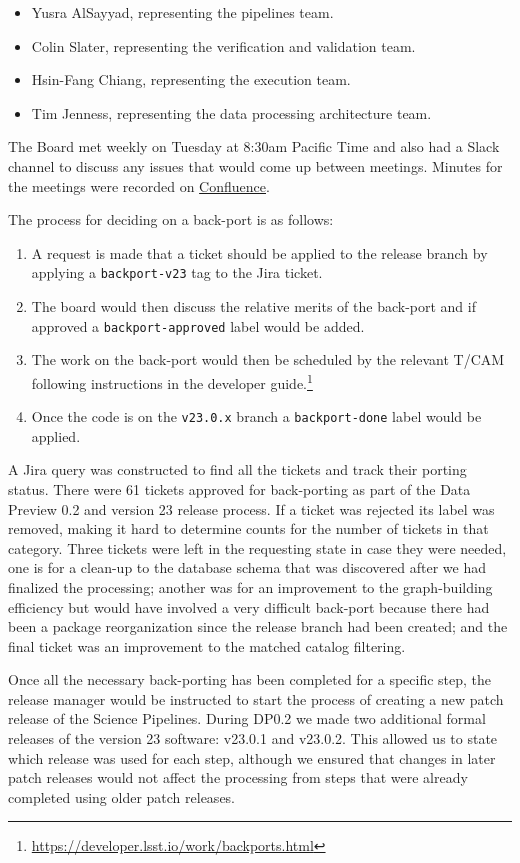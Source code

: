 \begin{itemize}
\item Yusra AlSayyad, representing the pipelines team.
\item Colin Slater, representing the verification and validation team.
\item Hsin-Fang Chiang, representing the execution team.
\item Tim Jenness, representing the data processing architecture team.
\end{itemize}

The Board met weekly on Tuesday at 8:30am Pacific Time and also had a Slack channel to discuss any issues that would come up between meetings.
Minutes for the meetings were recorded on \href{https://confluence.lsstcorp.org/display/LSSTOps/Data+Production+Meetings}{Confluence}.

The process for deciding on a back-port is as follows:

\begin{enumerate}

\item A request is made that a ticket should be applied to the release branch by applying a \texttt{backport-v23} tag to the Jira ticket.
\item The board would then discuss the relative merits of the back-port and if approved a \texttt{backport-approved} label would be added.
\item The work on the back-port would then be scheduled by the relevant T/CAM following instructions in the developer guide.\footnote{\url{https://developer.lsst.io/work/backports.html}}
\item Once the code is on the \texttt{v23.0.x} branch a \texttt{backport-done} label would be applied.

\end{enumerate}

A Jira query was constructed to find all the tickets and track their porting status.
There were 61 tickets approved for back-porting as part of the Data Preview 0.2 and version 23 release process.
If a ticket was rejected its label was removed, making it hard to determine counts for the number of tickets in that category.
Three tickets were left in the requesting state in case they were needed, one is for a clean-up to the database schema that was discovered after we had finalized the processing; another was for an improvement to the graph-building efficiency but would have involved a very difficult back-port because there had been a package reorganization since the release branch had been created; and the final ticket was an improvement to the matched catalog filtering.

Once all the necessary back-porting has been completed for a specific step, the release manager would be instructed to start the process of creating a new patch release of the Science Pipelines.
During DP0.2 we made two additional formal releases of the version 23 software: v23.0.1 and v23.0.2.
This allowed us to state which release was used for each step, although we ensured that changes in later patch releases would not affect the processing from steps that were already completed using older patch releases.
